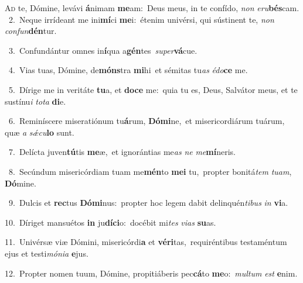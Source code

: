 \lettrine{\initial\textcolor{\initialcolor}{A}}{d} te, Dómine, levávi \textbf{á}\-nimam \textbf{me}\-am:~\star Deus meus, in te confído, \textit{non} \textit{e}\-\textit{ru}\textbf{bés}cam.\\
{\numbfont\textcolor{\numbcolor}{~2.}}~Neque irrídeant me ini\-\textbf{mí}\-ci \textbf{me}\-i:~\star étenim univérsi, qui sústinent te, \textit{non} \textit{con}\-\textit{fun}\textbf{dén}tur.\par
{\numbfont\textcolor{\numbcolor}{~3.}}~Confundántur omnes in\-\textbf{í}\-qua a\-\textbf{gén}\-tes~\star \textit{su}\-\textit{per}\textbf{vá}cue.\par
{\numbfont\textcolor{\numbcolor}{~4.}}~Vias tuas, Dómine, de\-\textbf{móns}\-tra \textbf{mi}\-hi~\star et sémitas tu\textit{as} \textit{é}\-\textit{do}\textbf{ce} me.\par
{\numbfont\textcolor{\numbcolor}{~5.}}~Dírige me in veritáte \textbf{tu}\-a, et \textbf{do}\-\textbf{ce} me:~\star quia tu es, Deus, Salvátor meus, et te sustínu\textit{i} \textit{to}\-\textit{ta} \textbf{di}\-e.\par
{\numbfont\textcolor{\numbcolor}{~6.}}~Reminíscere miseratiónum tu\-\textbf{á}\-rum, \textbf{Dó}\-\textbf{mi}ne,~\star et misericordiárum tuárum, quæ \textit{a} \textit{sǽ}\-\textit{cu}\textbf{lo} sunt.\par
{\numbfont\textcolor{\numbcolor}{~7.}}~Delícta juven\-\textbf{tú}\-tis \textbf{me}\-æ,~\star et ignorántias me\textit{as} \textit{ne} \textit{me}\-\textbf{mí}neris.\par
{\numbfont\textcolor{\numbcolor}{~8.}}~Secúndum misericórdiam tuam me\-\textbf{mén}\-to \textbf{me}\-\textbf{i} tu,~\star propter bonitá\textit{tem} \textit{tu}\-\textit{am}, \textbf{Dó}\-mine.\par
{\numbfont\textcolor{\numbcolor}{~9.}}~Dulcis et \textbf{rec}\-tus \textbf{Dó}\-\textbf{mi}nus:~\star propter hoc legem dabit delinquén\-\textit{ti}\-\textit{bus} \textit{in} \textbf{vi}\-a.\par
{\numbfont\textcolor{\numbcolor}{10.}}~Díriget mansuétos \textbf{in} ju\-\textbf{dí}\-\textbf{ci}o:~\star docébit mi\textit{tes} \textit{vi}\-\textit{as} \textbf{su}\-as.\par
{\numbfont\textcolor{\numbcolor}{11.}}~Univérsæ viæ Dómini, misericórdi\textbf{a} et \textbf{vé}\-\textbf{ri}tas,~\star requiréntibus testaméntum ejus et testi\-\textit{mó}\-\textit{ni}\textit{a} \textbf{e}\-jus.\par
{\numbfont\textcolor{\numbcolor}{12.}}~Propter nomen tuum, Dómine, propitiáberis pec\-\textbf{cá}\-to \textbf{me}\-o:~\star \textit{mul}\-\textit{tum} \textit{est} \textbf{e}\-nim.\par
